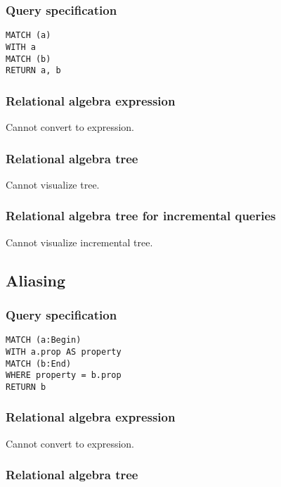 \subsubsection*{Query specification}

\begin{lstlisting}
MATCH (a)
WITH a
MATCH (b)
RETURN a, b
\end{lstlisting}

\subsubsection*{Relational algebra expression}

Cannot convert to expression.

\subsubsection*{Relational algebra tree}

Cannot visualize tree.

\subsubsection*{Relational algebra tree for incremental queries}

Cannot visualize incremental tree.

\subsection{Aliasing}

\subsubsection*{Query specification}

\begin{lstlisting}
MATCH (a:Begin)
WITH a.prop AS property
MATCH (b:End)
WHERE property = b.prop
RETURN b
\end{lstlisting}

\subsubsection*{Relational algebra expression}

Cannot convert to expression.

\subsubsection*{Relational algebra tree}


